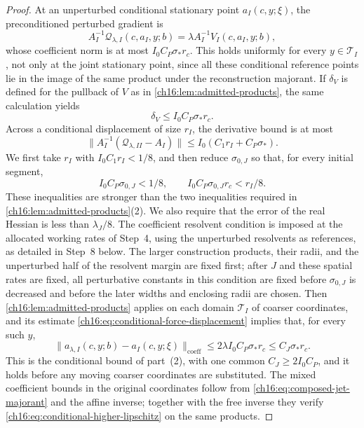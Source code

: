 \begin{proof}
At an unperturbed conditional stationary point $a_I(c,y;\xi)$, the preconditioned perturbed gradient is
\[
 A_I^{-1}\mathcal Q_{\lambda,I}(c,a_I,y;b)
       =\lambda A_I^{-1}V_I(c,a_I,y;b),
\]
whose coefficient norm is at most $I_0C_P\sigma_*r_c$. This holds uniformly for every $y\in\mathcal T_I$, not only at the joint stationary point, since all these conditional reference points lie in the image of the same product under the reconstruction majorant. If $\delta_V$ is defined for the pullback of $V$ as in \cref{ch16:lem:admitted-products}, the same calculation yields
\begin{equation}\label{ch16:eq:controlled-conditional-force}
 \delta_V\le I_0C_P\sigma_*r_c.
\end{equation}
Across a conditional displacement of size $r_I$, the derivative bound is at most
\begin{equation}\label{ch16:eq:prefix-perturbation-gates}
 \|A_I^{-1}(\mathcal Q_{\lambda,II}-A_I)\|
                    \le I_0(C_1r_I+C_P\sigma_*).
\end{equation}
We first take $r_I$ with $I_0C_1r_I<1/8$, and then reduce $\sigma_{0,J}$ so that, for every initial segment,
\[
 I_0C_P\sigma_{0,J}<1/8,\qquad
 I_0C_P\sigma_{0,J}r_c<r_I/8.
\]
These inequalities are stronger than the two inequalities required in \cref{ch16:lem:admitted-products}(2). We also require that the error of the real Hessian is less than $\lambda_J/8$. The coefficient resolvent condition is imposed at the allocated working rates of Step~4, using the unperturbed resolvents as references, as detailed in Step~8 below. The larger construction products, their radii, and the unperturbed half of the resolvent margin are fixed first; after $J$ and these spatial rates are fixed, all perturbative constants in this condition are fixed before $\sigma_{0,J}$ is decreased and before the later widths and enclosing radii are chosen. Then \cref{ch16:lem:admitted-products} applies on each domain $\mathcal T_I$ of coarser coordinates, and its estimate \eqref{ch16:eq:conditional-force-displacement} implies that, for every such $y$,
\begin{equation}\label{ch16:eq:conditional-perturbed-displacement}
 \|a_{\lambda,I}(c,y;b)-a_I(c,y;\xi)\|_{\mathrm{coeff}}
       \le2\lambda I_0C_P\sigma_*r_c
       \le C_J\sigma_*r_c.
\end{equation}
This is the conditional bound of part~(2), with one common $C_J\ge2I_0C_P$, and it holds before any moving coarser coordinates are substituted. The mixed coefficient bounds in the original coordinates follow from \eqref{ch16:eq:composed-jet-majorant} and the affine inverse; together with the free inverse they verify \eqref{ch16:eq:conditional-higher-lipschitz} on the same products.


\end{proof}
